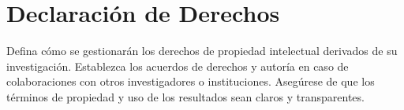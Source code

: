 \chapter{Declaración de Derechos}

Defina cómo se gestionarán los derechos de propiedad intelectual derivados de su investigación.
Establezca los acuerdos de derechos y autoría en caso de colaboraciones con otros investigadores o instituciones.
Asegúrese de que los términos de propiedad y uso de los resultados sean claros y transparentes.


